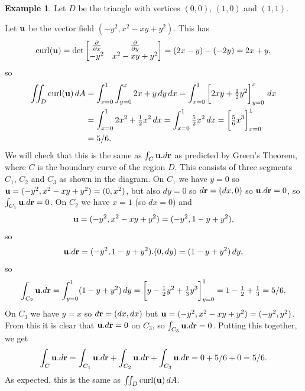 \documentclass[reqno]{amsart}
\theoremstyle{definition}
\newtheorem{example}[theorem]{Example}
\begin{document}
\begin{example}
 Let $D$ be the triangle with vertices $(0,0)$, $(1,0)$ and $(1,1)$.
 \begin{center}
 \end{center}
 Let $\mathbf{u}$ be the vector field $(-y^2,x^2-xy+y^2)$.  This has 
 \[ \operatorname{curl}(\mathbf{u}) = 
     \det\left[\begin{matrix} \frac{\partial}{\partial x} & \frac{\partial}{\partial y} \\ -y^2 & x^2-xy+y^2 \end{matrix}\right] = 
      (2x-y)-(-2y) = 2x+y,
 \]
 so 
 \begin{align*}
  \iint_D \curl(\vu)\,dA
   &= \int_{x=0}^1\int_{y=0}^x 2x+y\,dy\,dx 
    = \int_{x=0}^1\CH{2xy+\half y^2}_{y=0}^x \,dx \\
   &= \int_{x=0}^1 2x^2+\half x^2\,dx 
    = \int_{x=0}^1 \tfrac{5}{2}x^2\,dx 
    = \CH{\tfrac{5}{6}x^3}_{x=0}^1 \\
   &= 5/6. 
 \end{align*}
 We will check that this is the same as $\int_C\mathbf{u}.d\mathbf{r}$ as predicted
 by Green's Theorem, where $C$ is the boundary curve of the region
 $D$.  This consists of three segments $C_1$, $C_2$ and $C_3$ as shown
 in the diagram.  On $C_1$ we have $y=0$ so
 $\mathbf{u}=(-y^2,x^2-xy+y^2)=(0,x^2)$, but also $dy=0$ so $d\mathbf{r}=(dx,0)$ so
 $\mathbf{u}.d\mathbf{r}=0$, so $\int_{C_1}\mathbf{u}.d\mathbf{r}=0$.  On $C_2$ we have $x=1$ (so
 $dx=0$) and
 \[ \mathbf{u} = (-y^2,x^2-xy+y^2) = (-y^2,1-y+y^2), \]
 so 
 \[ \mathbf{u}.d\mathbf{r} = (-y^2,1-y+y^2).(0,dy) = 
      (1-y+y^2)\,dy,
 \]
 so 
 \[ \int_{C_2}\vu.d\vr =
     \int_{y=0}^1 (1-y+y^2)\,dy = 
      \CH{y-\half y^2+ \tfrac{1}{3}y^3}_{y=0}^1 = 
         1-\half+\tfrac{1}{3} = 5/6.
 \]
 On $C_3$ we have $y=x$ so $d\mathbf{r}=(dx,dx)$ but
 $\mathbf{u}=(-y^2,x^2-xy+y^2)=(-y^2,y^2)$.  From this it is clear that
 $\mathbf{u}.d\mathbf{r}=0$ on $C_3$, so $\int_{C_3}\mathbf{u}.d\mathbf{r}=0$.  Putting this
 together, we get
 \[ \int_C\mathbf{u}.d\mathbf{r} =
    \int_{C_1}\mathbf{u}.d\mathbf{r} +
    \int_{C_2}\mathbf{u}.d\mathbf{r} +
    \int_{C_3}\mathbf{u}.d\mathbf{r} =
    0 + 5/6 + 0 = 5/6.
 \]
 As expected, this is the same as $\iint_D\operatorname{curl}(\mathbf{u})\,dA$.
\end{example}
\end{document}

